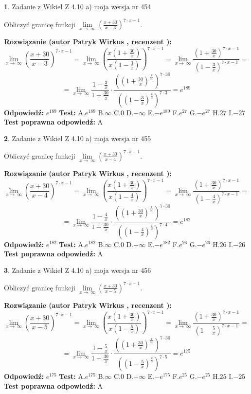 \documentclass[12pt, a4paper]{article}
\theoremstyle{definition} %
\newtheorem{zad}{}
\newcommand{\zadStart}[1]{\begin{zad}#1\newline}
\newcommand{\zadStop}{\end{zad}}
\newcommand{\rozwStart}[2]{\noindent \textbf{Rozwiązanie (autor #1 , recenzent #2): }\newline}
\newcommand{\rozwStop}{\newline}
\newcommand{\odpStart}{\noindent \textbf{Odpowiedź:}\newline}
\newcommand{\odpStop}{\newline}
\newcommand{\testStart}{\noindent \textbf{Test:}\newline}
\newcommand{\testStop}{\newline}
\newcommand{\kluczStart}{\noindent \textbf{Test poprawna odpowiedź:}\newline}
\newcommand{\kluczStop}{\newline}
\begin{document}
\zadStart{Zadanie z Wikieł Z 4.10 a) moja wersja nr 454}

Obliczyć granicę funkcji  $\lim\limits_{x\to\ \infty}(\frac{x+30}{x-3})^{7\cdot x-1}$.
\zadStop
\rozwStart{Patryk Wirkus}{}
$$\lim\limits_{x\to\ \infty}(\frac{x+30}{x-3})^{7\cdot x-1} = \lim\limits_{x\to\ \infty}(\frac{x(1+\frac{30}{x})}{x(1-\frac{3}{x})})^{7\cdot x-1}=\lim\limits_{x\to\ \infty}\frac{(1+\frac{30}{x})^{7\cdot x-1}}{(1-\frac{3}{x})^{7\cdot x-1}}=$$
$$=\lim\limits_{x\to\ \infty}\frac{1-\frac{3}{x}}{1+\frac{30}{x}}\cdot\frac{((1+\frac{30}{x})^{\frac{x}{30}})^{7\cdot30}}{((1-\frac{3}{x})^{\frac{x}{3}})^{7\cdot3}}=e^{189}$$
\rozwStop
\odpStart
$e^{189}$
\odpStop
\testStart
A.$e^{189}$ B.$\infty$ C.$0$ D.$-\infty$ E.$-e^{189}$
F.$e^{27}$ G.$-e^{27}$
H.$27$
I.$-27$
\testStop
\kluczStart
A
\kluczStop



\zadStart{Zadanie z Wikieł Z 4.10 a) moja wersja nr 455}

Obliczyć granicę funkcji  $\lim\limits_{x\to\ \infty}(\frac{x+30}{x-4})^{7\cdot x-1}$.
\zadStop
\rozwStart{Patryk Wirkus}{}
$$\lim\limits_{x\to\ \infty}(\frac{x+30}{x-4})^{7\cdot x-1} = \lim\limits_{x\to\ \infty}(\frac{x(1+\frac{30}{x})}{x(1-\frac{4}{x})})^{7\cdot x-1}=\lim\limits_{x\to\ \infty}\frac{(1+\frac{30}{x})^{7\cdot x-1}}{(1-\frac{4}{x})^{7\cdot x-1}}=$$
$$=\lim\limits_{x\to\ \infty}\frac{1-\frac{4}{x}}{1+\frac{30}{x}}\cdot\frac{((1+\frac{30}{x})^{\frac{x}{30}})^{7\cdot30}}{((1-\frac{4}{x})^{\frac{x}{4}})^{7\cdot4}}=e^{182}$$
\rozwStop
\odpStart
$e^{182}$
\odpStop
\testStart
A.$e^{182}$ B.$\infty$ C.$0$ D.$-\infty$ E.$-e^{182}$
F.$e^{26}$ G.$-e^{26}$
H.$26$
I.$-26$
\testStop
\kluczStart
A
\kluczStop



\zadStart{Zadanie z Wikieł Z 4.10 a) moja wersja nr 456}

Obliczyć granicę funkcji  $\lim\limits_{x\to\ \infty}(\frac{x+30}{x-5})^{7\cdot x-1}$.
\zadStop
\rozwStart{Patryk Wirkus}{}
$$\lim\limits_{x\to\ \infty}(\frac{x+30}{x-5})^{7\cdot x-1} = \lim\limits_{x\to\ \infty}(\frac{x(1+\frac{30}{x})}{x(1-\frac{5}{x})})^{7\cdot x-1}=\lim\limits_{x\to\ \infty}\frac{(1+\frac{30}{x})^{7\cdot x-1}}{(1-\frac{5}{x})^{7\cdot x-1}}=$$
$$=\lim\limits_{x\to\ \infty}\frac{1-\frac{5}{x}}{1+\frac{30}{x}}\cdot\frac{((1+\frac{30}{x})^{\frac{x}{30}})^{7\cdot30}}{((1-\frac{5}{x})^{\frac{x}{5}})^{7\cdot5}}=e^{175}$$
\rozwStop
\odpStart
$e^{175}$
\odpStop
\testStart
A.$e^{175}$ B.$\infty$ C.$0$ D.$-\infty$ E.$-e^{175}$
F.$e^{25}$ G.$-e^{25}$
H.$25$
I.$-25$
\testStop
\kluczStart
A
\kluczStop
\end{document}
